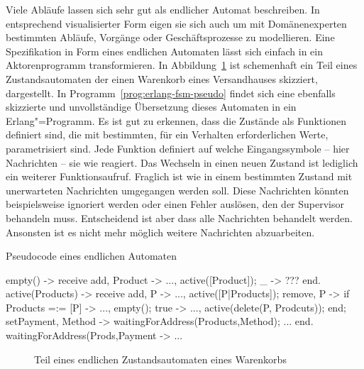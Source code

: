 Viele Abläufe lassen sich sehr gut als endlicher Automat beschreiben. In entsprechend visualisierter Form eigen sie sich auch um mit Domänenexperten bestimmten Abläufe, Vorgänge oder Geschäftsprozesse zu modellieren. Eine Spezifikation in Form eines endlichen Automaten lässt sich einfach in ein Aktorenprogramm transformieren. In Abbildung~\ref{fig:fsm-diag} ist schemenhaft ein Teil eines Zustandsautomaten der einen Warenkorb eines Versandhauses skizziert, dargestellt. In Programm~\ref{prog:erlang-fsm-pseudo} findet sich eine ebenfalls skizzierte und unvollständige Übersetzung dieses Automaten in ein Erlang"=Programm. Es ist gut zu erkennen, dass die Zustände als Funktionen definiert sind, die mit bestimmten, für ein Verhalten erforderlichen Werte, parametrisiert sind. Jede Funktion definiert auf welche Eingangssymbole -- hier Nachrichten -- sie wie reagiert. Das Wechseln in einen neuen Zustand ist lediglich ein weiterer Funktionsaufruf. Fraglich ist wie in einem bestimmten Zustand mit unerwarteten Nachrichten umgegangen werden soll. Diese Nachrichten könnten beispielsweise ignoriert werden oder einen Fehler auslösen, den der Supervisor behandeln muss. Entscheidend ist aber dass alle Nachrichten behandelt werden. Ansonsten ist es nicht mehr möglich weitere Nachrichten abzuarbeiten.

\begin{program}[!hbt]
\caption{Pseudocode eines endlichen Automaten}
\label{prog:erlang-fsm-pseudo}
\begin{ErlangCode}
empty() ->
	receive
		{ add, Product } -> ..., active([Product]);
		_ -> ??? %
	end.
active(Products) ->
	receive
		{ add, P } -> ..., active([P|Products]);
		{ remove, P } -> if Products =:= [P] -> ..., empty();
												true -> ..., active(delete(P, Prodcuts));
										 end;
		{ setPayment, Method } -> waitingForAddress({Products,Method});
		...
	end.
waitingForAddress({Prods,Payment} -> ...
\end{ErlangCode}
\end{program}

\begin{figure}[!hbt]%
\caption{Teil eines endlichen Zustandsautomaten eines Warenkorbs}%
\label{fig:fsm-diag}%
\end{figure}

